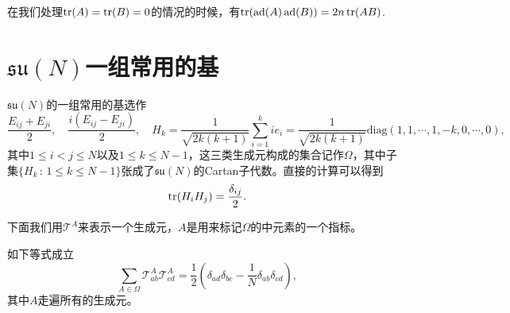 \documentclass[11pt]{article}
\theoremstyle{definition}
\theoremstyle{plain}
\DeclareMathOperator{\ad}{ad}
\begin{document}
在我们处理$\operatorname{tr}(A)=\operatorname{tr}(B)=0$的情况的时候，有$\tr(\ad(A)\ad(B))=2n \tr(AB)$. 

\clearpage
\section{$\mathfrak{su}(N)$一组常用的基}

$\mathfrak{su}(N)$的一组常用的基选作
\[
	\frac{E_{ij}+E_{ji}}{2},\quad \frac{i(E_{ij}-E_{ji})}{2},\quad H_k=\frac{1}{\sqrt{2k(k+1)}}\sum_{i=1}^{k} ie_{i}=\frac{1}{\sqrt{2k(k+1)}}
	\mathrm{diag}(1,1,\cdots,1,-k,0,\cdots,0),
\]
其中$1\leq i<j\leq N$以及$1\leq k \leq N-1$，这三类生成元构成的集合记作$\Omega$，其中子集$\{H_k\,:\,1\leq k \leq N-1\}$张成了$\mathfrak{su}(N)$的Cartan子代数。直接的计算可以得到
\[
	\operatorname{tr}(H_iH_j)=\frac{\delta_{ij}}{2}.
\]

下面我们用$\mathcal{T}^A$来表示一个生成元，$A$是用来标记$\Omega$的中元素的一个指标。

{\pro 如下等式成立
\[
	\sum_{A\in \Omega}\mathcal{T}^A_{ab}\mathcal{T}^A_{cd}=\frac{1}{2}\left(\delta_{ad}\delta_{bc}-\frac{1}{N}\delta_{ab}\delta_{cd}\right),
\]
其中$A$走遍所有的生成元。\endpro}
\end{document}
